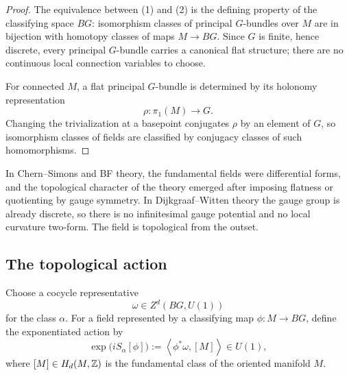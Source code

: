 \begin{proof}
The equivalence between (1) and (2) is the defining property of the classifying space $BG$: isomorphism classes of principal $G$-bundles over $M$ are in bijection with homotopy classes of maps $M\to BG$. Since $G$ is finite, hence discrete, every principal $G$-bundle carries a canonical flat structure; there are no continuous local connection variables to choose.

\medskip

\noindent For connected $M$, a flat principal $G$-bundle is determined by its holonomy representation
\begin{equation*}
\rho:\pi_1(M)\to G.
\end{equation*}
Changing the trivialization at a basepoint conjugates $\rho$ by an element of $G$, so isomorphism classes of fields are classified by conjugacy classes of such homomorphisms.
\end{proof}

\begin{remark}\label{rem:dw-no-local-connection}
In Chern--Simons and BF theory, the fundamental fields were differential forms, and the topological character of the theory emerged after imposing flatness or quotienting by gauge symmetry. In Dijkgraaf--Witten theory the gauge group is already discrete, so there is no infinitesimal gauge potential and no local curvature two-form. The field is topological from the outset.
\end{remark}

\subsection{The topological action}

\begin{definition}\label{def:dw-action}
Choose a cocycle representative
\begin{equation*}
\omega \in Z^d(BG,U(1))
\end{equation*}
for the class $\alpha$. For a field represented by a classifying map $\phi:M\to BG$, define the exponentiated action by
\begin{equation}\label{eq:dw-action-phase}
\exp\!\bigl(iS_\alpha[\phi]\bigr)
:=
\left\langle \phi^*\omega,[M]\right\rangle
\in U(1),
\end{equation}
where $[M]\in H_d(M,\mathbb{Z})$ is the fundamental class of the oriented manifold $M$.
\end{definition}

